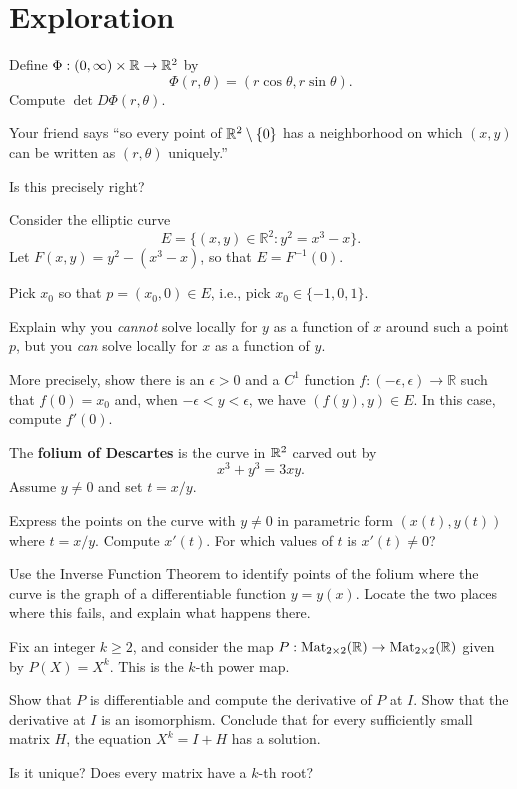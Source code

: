 \documentclass{homework}
\newcommand{\Mtwo}{\mathrm{Mat}_{2 \times 2}}
\begin{document}
\section{Exploration}

\begin{problem}
Define $\Phi:(0,\infty)\times\mathbb{R}\to\mathbb{R}^2$ by
\[
\Phi(r,\theta)=(r\cos\theta,r\sin\theta).
\]
Compute $\det D\Phi(r,\theta)$.

Your friend says ``so every point of $\mathbb{R}^2\setminus\{0\}$ has a neighborhood on which $(x,y)$ can be written as $(r,\theta)$ uniquely.''

Is this precisely right?
\end{problem}

\pagebreak

\begin{problem}
Consider the elliptic curve
\[
E=\{(x,y)\in\mathbb R^2 : y^2 = x^3 - x\}.
\]
Let $F(x,y)=y^2-(x^3-x)$, so that $E=F^{-1}(0)$.
 
Pick $x_0$ so that $p=(x_0,0)\in E$, i.e., pick $x_0\in\{-1,0,1\}$.

Explain why you \emph{cannot} solve locally for $y$ as a function of $x$ around such a point $p$, but you \emph{can} solve locally for $x$ as a function of $y$.

More precisely, show there is an $\epsilon > 0$ and a $C^1$ function $f:(-\epsilon,\epsilon)\to\mathbb R$ such that $f(0)=x_0$ and, when $-\epsilon < y < \epsilon$, we have $(f(y),y) \in E$. In this case, compute $f'(0)$.
\end{problem}

\begin{problem}
The \textbf{folium of Descartes} is the curve in $\mathbb{R}^2$ carved out by
\[
x^3+y^3=3xy.
\]
Assume $y\neq 0$ and set $t=x/y$.

Express the points on the curve with $y\neq 0$ in parametric form
$(x(t),y(t))$ where $t = x/y$. Compute $x'(t)$. For which values of $t$ is $x'(t)\neq 0$?

Use the Inverse Function Theorem to identify points of the folium where the curve is the graph of a differentiable function $y = y(x)$. Locate the two places where this fails, and explain what happens there.
\end{problem}

\begin{problem}
Fix an integer $k\ge 2$, and consider the map
$P: \Mtwo(\R)\to \Mtwo(\R)$
given by 
$P(X)=X^k$. This is the $k$-th power map.

Show that $P$ is differentiable and compute the derivative of $P$ at $I$. Show that the derivative at $I$ is an isomorphism. Conclude that for every sufficiently small matrix $H$, the equation $X^k=I+H$ has a solution.

Is it unique? Does every matrix have a $k$-th root?
\end{problem}
\end{document}
